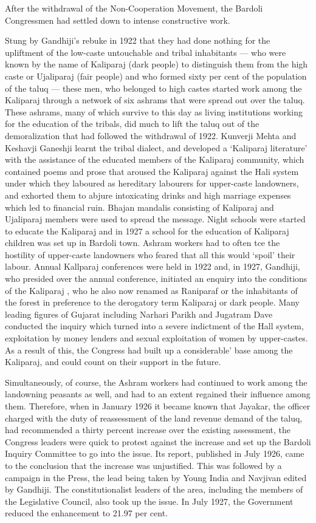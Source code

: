 After the withdrawal of the Non-Cooperation Movement, the Bardoli Congressmen had settled down to intense constructive work.

Stung by Gandhiji's rebuke in 1922 that they had done nothing for the upliftment of the low-caste untouchable and tribal inhabitants — who were known by the name of Kaliparaj (dark people) to distinguish them from the high caste or Ujaliparaj (fair people) and who formed sixty per cent of the population of the taluq — these men, who belonged to high castes started work among the Kaliparaj through a network of six ashrams that were spread out over the taluq. These ashrams, many of which survive to this day as living institutions working for the education of the tribals, did much to lift the taluq out of the demoralization that had followed the withdrawal of 1922. Kunverji Mehta and Keshavji Ganeshji learnt the tribal dialect, and developed a `Kaliparaj literature' with the assistance of the educated members of the Kaliparaj community, which contained poems and prose that aroused the Kaliparaj against the Hali system under which they laboured as hereditary labourers for upper-caste landowners, and exhorted them to abjure intoxicating drinks and high marriage expenses which led to financial ruin. Bhajan mandalis consisting of Kaliparaj and Ujaliparaj members were used to spread the message. Night schools were started to educate the Kaliparaj and in 1927 a school for the education of Kaliparaj children was set up in Bardoli town. Ashram workers had to often tce the hostility of upper-caste landowners who feared that all this would `spoil' their labour. Annual Kallparaj conferences were held in 1922 and, in 1927, Gandhiji, who presided over the annual conference, initiated an enquiry into the conditions of the Kaliparaj , who he also now renamed as Raniparaf or the inhabitants of the forest in preference to the derogatory term Kaliparaj or dark people. Many leading figures of Gujarat including Narhari Parikh and Jugatram Dave conducted the inquiry which turned into a severe indictment of the Hall system, exploitation by money lenders and sexual exploitation of women by upper-castes. As a result of this, the Congress had built up a considerable' base among the Kaliparaj, and could count on their support in the future.

Simultaneously, of course, the Ashram workers had continued to work among the landowning peasants as well, and had to an extent regained their influence among them. Therefore, when in January 1926 it became known that Jayakar, the officer charged with the duty of reassessment of the land revenue demand of the taluq, had recommended a thirty percent increase over the existing assessment, the Congress leaders were quick to protest against the increase and set up the Bardoli Inquiry Committee to go into the issue. Its report, published in July 1926, came to the conclusion that the increase was unjustified. This was followed by a campaign in the Press, the lead being taken by Young India and Navjivan edited by Gandhiji. The constitutionalist leaders of the area, including the members of the Legislative Council, also took up the issue. In July 1927, the Government reduced the enhancement to 21.97 per cent.

